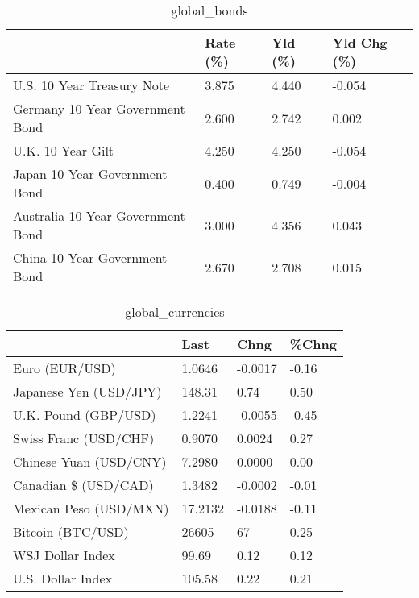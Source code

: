 \documentclass{article}%
\begin{document}
%


\begin{table}[htbp]%
\caption{global\_bonds}%
\centering%
\begin{adjustbox}{width=1\textwidth}%
\begin{tabular}{llll}
\toprule
                                  & Rate (\%) & Yld (\%) & Yld Chg (\%) \\
\midrule
       U.S. 10 Year Treasury Note &    3.875 &   4.440 &      -0.054 \\
  Germany 10 Year Government Bond &    2.600 &   2.742 &       0.002 \\
                U.K. 10 Year Gilt &    4.250 &   4.250 &      -0.054 \\
    Japan 10 Year Government Bond &    0.400 &   0.749 &      -0.004 \\
Australia 10 Year Government Bond &    3.000 &   4.356 &       0.043 \\
    China 10 Year Government Bond &    2.670 &   2.708 &       0.015 \\
\bottomrule
\end{tabular}
%
\end{adjustbox}%
\end{table}

%


\begin{table}[htbp]%
\caption{global\_currencies}%
\centering%
\begin{adjustbox}{width=1\textwidth}%
\begin{tabular}{llll}
\toprule
                       &    Last &    Chng & \%Chng \\
\midrule
        Euro (EUR/USD) &  1.0646 & -0.0017 & -0.16 \\
Japanese Yen (USD/JPY) &  148.31 &    0.74 &  0.50 \\
  U.K. Pound (GBP/USD) &  1.2241 & -0.0055 & -0.45 \\
 Swiss Franc (USD/CHF) &  0.9070 &  0.0024 &  0.27 \\
Chinese Yuan (USD/CNY) &  7.2980 &  0.0000 &  0.00 \\
  Canadian \$ (USD/CAD) &  1.3482 & -0.0002 & -0.01 \\
Mexican Peso (USD/MXN) & 17.2132 & -0.0188 & -0.11 \\
     Bitcoin (BTC/USD) &   26605 &      67 &  0.25 \\
      WSJ Dollar Index &   99.69 &    0.12 &  0.12 \\
     U.S. Dollar Index &  105.58 &    0.22 &  0.21 \\
\bottomrule
\end{tabular}
%
\end{adjustbox}%
\end{table}
\end{document}
